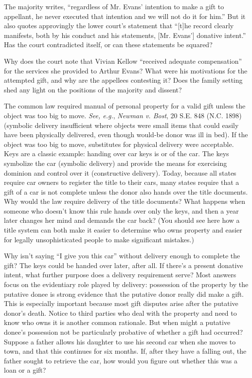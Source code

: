
\item The majority writes, ``regardless of Mr. Evans' intention to make a gift
to appellant, he never executed that intention and we will not do it for him.''
But it also quotes approvingly the lower court's statement that ``[t]he record
clearly manifests, both by his conduct and his statements, [Mr. Evans']
donative intent.'' Has the court contradicted itself, or can these statements
be squared?

\item Why does the court note that Vivian Kellow ``received adequate
compensation'' for the services she provided to Arthur Evans? What were his
motivations for the attempted gift, and why are the appellees contesting it?
Does the family setting shed any light on the positions of the majority and
dissent?


\item The common law required manual  of personal property for a
valid
gift unless the object was too big to move.  \emph{See, e.g.}, \emph{Newman v.
Bost}, 20 S.E.
848 (N.C. 1898) (symbolic delivery insufficient where objects were small items
that could easily have been physically delivered, even though would-be donor
was ill in bed).  If the object was too big to move, substitutes for physical
delivery were acceptable.  Keys are a classic example: handing over car keys is
 or  of the
car.  The keys symbolize the
car (symbolic delivery) and provide the means for exercising dominion and
control over it (constructive delivery).  Today, because all states require car
owners to register the title to their cars, many states require that a gift of
a car is not complete unless the donor also hands over the title documents. 
Why would the law require delivery of the title documents?  What happens when
someone who doesn't know this rule hands over only the keys, and then a year
later changes her mind and demands the car back?  (You should see here how a
title system can both make it easier to determine who owns property and easier
for legally unsophisticated people to make significant mistakes.)

Why isn't saying ``I give you this car'' without delivery enough to complete the
gift?  The keys could be handed over later, after all.  If there's a present
donative intent, what further purpose does a delivery requirement serve?  Most
answers focus on the evidentiary role played by delivery: possession of the
property by the putative donee is strong evidence that the putative donor
really did make a gift.  This is especially important because most gift
disputes arise after the putative donor's death.  Notice to third parties who
deal with the property and need to know who owns it is another common
rationale.  But when might a putative donee's possession not be particularly
probative of whether a gift had occurred?  Suppose a father allows his daughter
to use his second car when she moves to town, and that this continues for six
months.  If, after they have a falling out, the father sought to retrieve the
car, how would you figure out whether this was a loan or a gift? 



